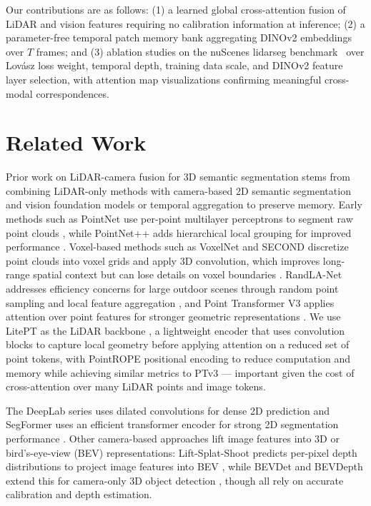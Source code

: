\documentclass[10pt,twocolumn,letterpaper]{article}
\begin{document}
Our contributions are as follows: (1) a learned global cross-attention fusion of LiDAR and vision features requiring no calibration information at inference; (2) a parameter-free temporal patch memory bank aggregating DINOv2 embeddings over $T$ frames; and (3) ablation studies on the nuScenes lidarseg benchmark~\cite{caesar2020nuscenesmultimodaldatasetautonomous} over Lovász loss weight, temporal depth, training data scale, and DINOv2 feature layer selection, with attention map visualizations confirming meaningful cross-modal correspondences.

\section{Related Work}
Prior work on LiDAR-camera fusion for 3D semantic segmentation stems from combining LiDAR-only methods with camera-based 2D semantic segmentation and vision foundation models or temporal aggregation to preserve memory. Early methods such as PointNet use per-point multilayer perceptrons to segment raw point clouds \cite{qi2017pointnetdeeplearningpoint}, while PointNet++ adds hierarchical local grouping for improved performance \cite{qi2017pointnetdeephierarchicalfeature}. Voxel-based methods such as VoxelNet and SECOND discretize point clouds into voxel grids and apply 3D convolution, which improves long-range spatial context but can lose details on voxel boundaries \cite{zhou2017voxelnetendtoendlearningpoint, s18103337}. RandLA-Net addresses efficiency concerns for large outdoor scenes through random point sampling and local feature aggregation \cite{hu2020randlanetefficientsemanticsegmentation}, and Point Transformer V3 applies attention over point features for stronger geometric representations \cite{wu2024pointtransformerv3simpler}. We use LitePT as the LiDAR backbone \cite{litept2025}, a lightweight encoder that uses convolution blocks to capture local geometry before applying attention on a reduced set of point tokens, with PointROPE positional encoding to reduce computation and memory while achieving similar metrics to PTv3 — important given the cost of cross-attention over many LiDAR points and image tokens.

The DeepLab series uses dilated convolutions for dense 2D prediction \cite{chen2017rethinkingatrousconvolutionsemantic, chen2018encoderdecoderatrousseparableconvolution} and SegFormer uses an efficient transformer encoder for strong 2D segmentation performance \cite{xie2021segformersimpleefficientdesign}. Other camera-based approaches lift image features into 3D or bird's-eye-view (BEV) representations: Lift-Splat-Shoot predicts per-pixel depth distributions to project image features into BEV \cite{philion2020liftsplatshootencoding}, while BEVDet and BEVDepth extend this for camera-only 3D object detection \cite{huang2022bevdethighperformancemulticamera3d, li2022bevdepthacquisitionreliabledepth}, though all rely on accurate calibration and depth estimation.
\end{document}
